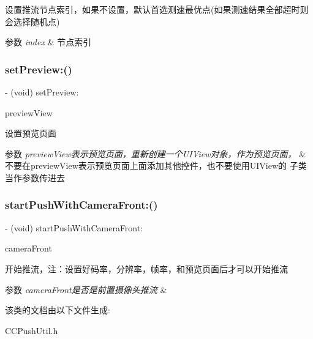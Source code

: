 设置推流节点索引，如果不设置，默认首选测速最优点(如果测速结果全部超时则会选择随机点) 


\begin{DoxyParams}{参数}
{\em index} & 节点索引 \\
\hline
\end{DoxyParams}
\mbox{\label{interface_c_c_push_util_a5d7d1fe16a235b70c8c3fe7561d565bc}} 
\subsubsection{\texorpdfstring{set\+Preview\+:()}{setPreview:()}}
{\footnotesize\ttfamily -\/ (void) set\+Preview\+: \begin{DoxyParamCaption}\item[{(U\+I\+View $\ast$)}]{preview\+View }\end{DoxyParamCaption}}



设置预览页面 


\begin{DoxyParams}{参数}
{\em preview\+View表示预览页面，重新创建一个\+U\+I\+View对象，作为预览页面，} & 不要在preview\+View表示预览页面上面添加其他控件，也不要使用\+U\+I\+View的 子类当作参数传进去 \\
\hline
\end{DoxyParams}
\mbox{\label{interface_c_c_push_util_aab53c1f3bb2cdd070681aa497e4f5bf7}} 
\subsubsection{\texorpdfstring{start\+Push\+With\+Camera\+Front\+:()}{startPushWithCameraFront:()}}
{\footnotesize\ttfamily -\/ (void) start\+Push\+With\+Camera\+Front\+: \begin{DoxyParamCaption}\item[{(B\+O\+OL)}]{camera\+Front }\end{DoxyParamCaption}}



开始推流，注：设置好码率，分辨率，帧率，和预览页面后才可以开始推流 


\begin{DoxyParams}{参数}
{\em camera\+Front是否是前置摄像头推流} & \\
\hline
\end{DoxyParams}


该类的文档由以下文件生成\+:\begin{DoxyCompactItemize}
\item 
C\+C\+Push\+Util.\+h\end{DoxyCompactItemize}

